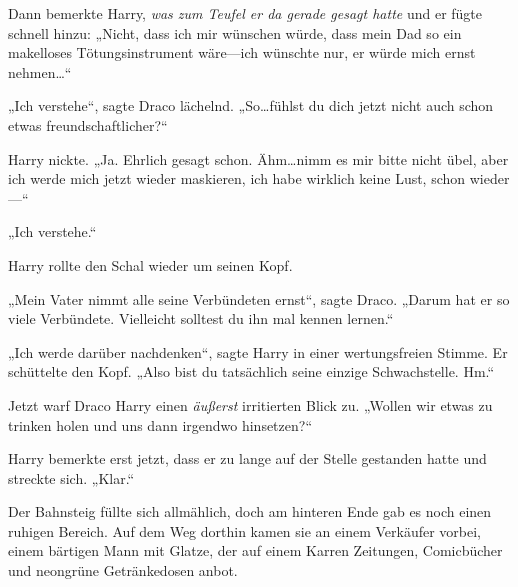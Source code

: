 Dann bemerkte Harry, \emph{was zum Teufel er da gerade gesagt hatte} und er fügte schnell hinzu: „Nicht, dass ich mir wünschen würde, dass mein Dad so ein makelloses Tötungsinstrument wäre—ich wünschte nur, er würde mich ernst nehmen…“

„Ich verstehe“, sagte Draco lächelnd. „So…fühlst du dich jetzt nicht auch schon etwas freundschaftlicher?“

Harry nickte. „Ja. Ehrlich gesagt schon. Ähm…nimm es mir bitte nicht übel, aber ich werde mich jetzt wieder maskieren, ich habe wirklich keine Lust, schon wieder—“

„Ich verstehe.“

Harry rollte den Schal wieder um seinen Kopf.

„Mein Vater nimmt alle seine Verbündeten ernst“, sagte Draco. „Darum hat er so viele Verbündete. Vielleicht solltest du ihn mal kennen lernen.“

„Ich werde darüber nachdenken“, sagte Harry in einer wertungsfreien Stimme. Er schüttelte den Kopf. „Also bist du tatsächlich seine einzige Schwachstelle. Hm.“

Jetzt warf Draco Harry einen \emph{äußerst} irritierten Blick zu. „Wollen wir etwas zu trinken holen und uns dann irgendwo hinsetzen?“

Harry bemerkte erst jetzt, dass er zu lange auf der Stelle gestanden hatte und streckte sich. „Klar.“

Der Bahnsteig füllte sich allmählich, doch am hinteren Ende gab es noch einen ruhigen Bereich. Auf dem Weg dorthin kamen sie an einem Verkäufer vorbei, einem bärtigen Mann mit Glatze, der auf einem Karren Zeitungen, Comicbücher und neongrüne Getränkedosen anbot.

